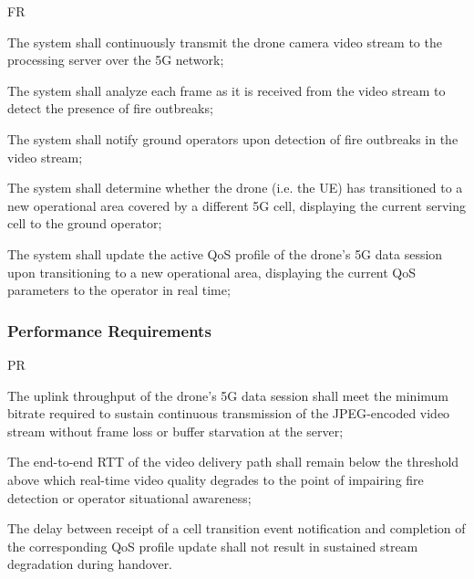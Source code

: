 \begin{custenumerate}{FR}
    \item The system shall continuously transmit the drone camera video stream to the processing server over the \acs{5G} network;
    \item The system shall analyze each frame as it is received from the video stream to detect the presence of fire outbreaks;
    \item The system shall notify ground operators upon detection of fire outbreaks in the video stream;
    \item The system shall determine whether the drone (i.e. the \acs{UE}) has transitioned to a new operational area covered by a different \acs{5G} cell, displaying the current serving cell to the ground operator;
    \item The system shall update the active \acs{QoS} profile of the drone's \acs{5G} data session upon transitioning to a new operational area, displaying the current \acs{QoS} parameters to the operator in real time;
\end{custenumerate}

\subsubsection{Performance Requirements}


\begin{custenumerate}{PR}
    \item The uplink throughput of the drone's \acs{5G} data session shall meet the minimum bitrate required to sustain continuous transmission of the \acs{JPEG}-encoded video stream without frame loss or buffer starvation at the server;
    \item The end-to-end \acs{RTT} of the video delivery path shall remain below the threshold above which real-time video quality degrades to the point of impairing fire detection or operator situational awareness;
    \item The delay between receipt of a cell transition event notification and completion of the corresponding \acs{QoS} profile update shall not result in sustained stream degradation during handover.
\end{custenumerate}

